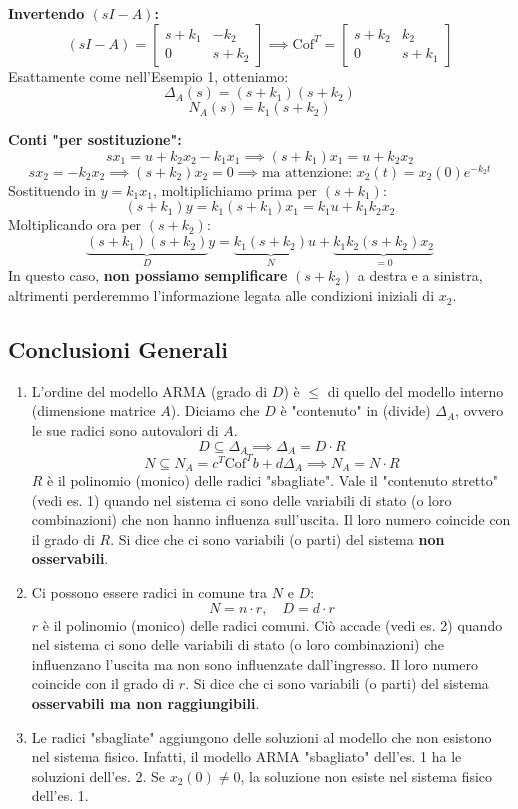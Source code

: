 \documentclass[11pt,a4paper]{article}
\begin{document}
\textbf{Invertendo $(sI - A)$:}
$$ (sI - A) = \begin{bmatrix} s+k_1 & -k_2 \\ 0 & s+k_2 \end{bmatrix} \implies \text{Cof}^T = \begin{bmatrix} s+k_2 & k_2 \\ 0 & s+k_1 \end{bmatrix} $$
Esattamente come nell'Esempio 1, otteniamo:
$$ \Delta_A(s) = (s+k_1)(s+k_2) $$
$$ N_A(s) = k_1(s+k_2) $$

\textbf{Conti "per sostituzione":}
$$ s x_1 = u + k_2 x_2 - k_1 x_1 \implies (s+k_1)x_1 = u + k_2 x_2 $$
$$ s x_2 = -k_2 x_2 \implies (s+k_2)x_2 = 0 \implies \text{ma attenzione: } x_2(t) = x_2(0)e^{-k_2 t} $$
Sostituendo in $y = k_1 x_1$, moltiplichiamo prima per $(s+k_1)$:
$$ (s+k_1)y = k_1(s+k_1)x_1 = k_1 u + k_1 k_2 x_2 $$
Moltiplicando ora per $(s+k_2)$:
$$ \underbrace{(s+k_1)(s+k_2)}_{D} y = \underbrace{k_1(s+k_2)}_{N} u + \underbrace{k_1 k_2 (s+k_2) x_2}_{= 0} $$
In questo caso, \textbf{non possiamo semplificare} $(s+k_2)$ a destra e a sinistra, altrimenti perderemmo l'informazione legata alle condizioni iniziali di $x_2$.

\subsection{Conclusioni Generali}

\begin{enumerate}
    \item L'ordine del modello ARMA (grado di $D$) è $\le$ di quello del modello interno (dimensione matrice $A$). Diciamo che $D$ è "contenuto" in (divide) $\Delta_A$, ovvero le sue radici sono autovalori di $A$.
    $$ D \subseteq \Delta_A \implies \Delta_A = D \cdot R $$
    $$ N \subseteq N_A = c^T \text{Cof}^T b + d \Delta_A \implies N_A = N \cdot R $$
    $R$ è il polinomio (monico) delle radici "sbagliate". 
    Vale il "contenuto stretto" (vedi es. 1) quando nel sistema ci sono delle variabili di stato (o loro combinazioni) che non hanno influenza sull'uscita. Il loro numero coincide con il grado di $R$.
    Si dice che ci sono variabili (o parti) del sistema \textbf{non osservabili}.

    \item Ci possono essere radici in comune tra $N$ e $D$:
    $$ N = n \cdot r, \quad D = d \cdot r $$
    $r$ è il polinomio (monico) delle radici comuni.
    Ciò accade (vedi es. 2) quando nel sistema ci sono delle variabili di stato (o loro combinazioni) che influenzano l'uscita ma non sono influenzate dall'ingresso. Il loro numero coincide con il grado di $r$.
    Si dice che ci sono variabili (o parti) del sistema \textbf{osservabili ma non raggiungibili}.

    \item Le radici "sbagliate" aggiungono delle soluzioni al modello che non esistono nel sistema fisico. Infatti, il modello ARMA "sbagliato" dell'es. 1 ha le soluzioni dell'es. 2. Se $x_2(0) \ne 0$, la soluzione non esiste nel sistema fisico dell'es. 1.
\end{enumerate}
\end{document}
